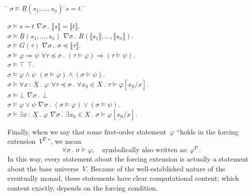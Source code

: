 \documentclass[com,11pt,crcready]{iosart2x}
\theoremstyle{definition}
\theoremstyle{plain}
\theoremstyle{remark}
\newcommand{\?}{\,{:}\,}
\newcommand{\forces}{\vDash}
\renewcommand{\_}{\mathpunct{.}\,}
\begin{document}
\begin{tabbing}
  \qquad \= $\sigma \forces \underline{R}(\underline{s_1},\ldots,\underline{s_n})$ \=  $s = t$. \= \kill

  \> $\sigma \forces s = t$
  \>  $\nabla \sigma\_ \llbracket s \rrbracket = \llbracket t \rrbracket$. \\[0.3em]

  \> $\sigma \forces \underline{R}(s_1,\ldots,s_n)$
  \>  $\nabla\sigma\_ R(\llbracket s_1 \rrbracket,\ldots,\llbracket s_n \rrbracket)$. \\[0.3em]

  \> $\sigma \forces G(\tau)$
  \>  $\nabla\sigma\_ \sigma \preceq \llbracket\tau\rrbracket$. \\[0.3em]

  \> $\sigma \forces \varphi \Rightarrow \psi$
  \>  $\forall \tau \preceq \sigma\_ (\tau \forces \varphi) \Rightarrow
  (\tau \forces \psi)$. \\[0.3em]

  \> $\sigma \forces \top$ \>  $\top$. \\[0.3em]

  \> $\sigma \forces \varphi \wedge \psi$
  \>  $(\sigma \forces \varphi) \wedge (\sigma \forces \psi)$. \\[0.3em]

  \> $\sigma \forces \forall x\?\underline{X}\_ \varphi$
  \>  $\forall \tau \preceq \sigma\_ \forall x_0 \in X\_ \tau \forces
  \varphi[\underline{x_0}/x]$. \\[0.3em]

  \> $\sigma \forces \bot$ \>  $\nabla\sigma\_ \bot$ \\[0.3em]

  \> $\sigma \forces \varphi \vee \psi$
  \>  $\nabla\sigma\_ (\sigma \forces \varphi) \vee (\sigma \forces \psi)$. \\[0.3em]

  \> $\sigma \forces \exists x\?\underline{X}\_ \varphi$
  \>  $\nabla\sigma\_ \exists x_0 \in X\_ \sigma \forces \varphi[\underline{x_0}/x]$.
\end{tabbing}
Finally, when we say that some first-order statement~$\varphi$ ``holds in the
forcing extension~$V^\nabla$'', we mean
\[ \forall \sigma\_ \sigma \forces \varphi,
\quad\text{symbolically also written as: $\varphi^\nabla$.} \]
In this way, every statement about the forcing extension is actually a
statement about the base universe~$V$. Because of the well-established nature
of the eventually monad, these statements have clear computational content;
which content exactly, depends on the forcing condition.
\end{document}
